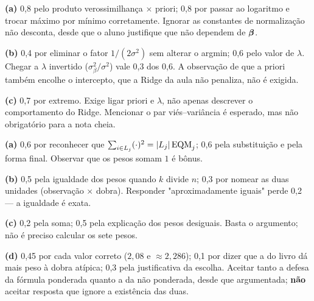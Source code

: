 \documentclass[11pt,a4paper]{article}
\begin{document}



\begin{criterio}
\textbf{(a)} 0,8 pelo produto verossimilhança $\times$ priori; 0,8 por passar ao
logaritmo e trocar máximo por mínimo corretamente. Ignorar as constantes de
normalização não desconta, desde que o aluno justifique que não dependem de
$\bm{\beta}$.

\textbf{(b)} 0,4 por eliminar o fator $1/(2\sigma^2)$ sem alterar o argmin; 0,6
pelo valor de $\lambda$. Chegar a $\lambda$ invertido
($\sigma_\beta^2/\sigma^2$) vale 0,3 dos 0,6. A observação de que a priori também
encolhe o intercepto, que a Ridge da aula não penaliza, não é exigida.

\textbf{(c)} 0,7 por extremo. Exige ligar priori e $\lambda$, não apenas
descrever o comportamento do Ridge. Mencionar o par viés--variância é esperado,
mas não obrigatório para a nota cheia.
\end{criterio}



\begin{criterio}
\textbf{(a)} 0,6 por reconhecer que
$\sum_{i\in L_j}(\cdot)^2=\left\lvert L_j \right\rvert\mathrm{EQM}_j$; 0,6 pela substituição e pela
forma final. Observar que os pesos somam $1$ é bônus.

\textbf{(b)} 0,5 pela igualdade dos pesos quando $k$ divide $n$; 0,3 por nomear as
duas unidades (observação $\times$ dobra). Responder "aproximadamente iguais"
perde 0,2 --- a igualdade é exata.

\textbf{(c)} 0,2 pela soma; 0,5 pela explicação dos pesos desiguais. Basta o
argumento; não é preciso calcular os sete pesos.

\textbf{(d)} 0,45 por cada valor correto ($2{,}08$ e $\approx 2{,}286$); 0,1 por
dizer que a do livro dá mais peso à dobra atípica; 0,3 pela justificativa da
escolha. Aceitar tanto a defesa da fórmula ponderada quanto a da
não ponderada, desde que argumentada; \textbf{não} aceitar resposta que ignore a
existência das duas.
\end{criterio}
\end{document}
